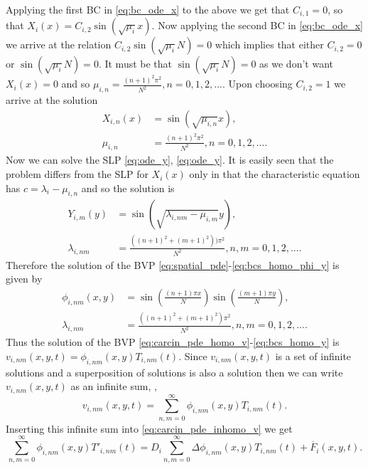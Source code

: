 \documentclass[\main/thesis.tex]{subfiles}
\begin{document}
Applying the first BC in \eqref{eq:bc_ode_x} to the above we get that $C_{i,1} {=} 0$, so that $X_i(x) {=} C_{i,2}\sin(\sqrt{\mu_i} x)$. Now applying the second BC in \eqref{eq:bc_ode_x} we arrive at the relation $C_{i,2}\sin(\sqrt{\mu_i} N) {=} 0$ which implies that either $C_{i,2} {=} 0$ or $\sin(\sqrt{\mu_i} N) {=} 0$. It must be that $\sin(\sqrt{\mu_i} N) {=} 0$ as we don't want $X_i(x) {=} 0$ and so $\mu_{i,n} {=} \frac{(n+1)^2\pi^2}{N^2}, n {=} 0, 1, 2, ...$. Upon choosing $C_{i,2} {=} 1$ we arrive at the solution
\begin{align*}
X_{i,n}(x) &{=} \sin(\sqrt{\mu_{i,n}} x), \\
\mu_{i,n} &{=} \frac{(n+1)^2\pi^2}{N^2}, n {=} 0, 1, 2, ....
\end{align*}
Now we can solve the SLP \eqref{eq:ode_y}, \eqref{eq:ode_y}. It is easily seen that the problem differs from the SLP for $X_i(x)$ only in that the characteristic equation has $c {=} \lambda_i {-} \mu_{i, n}$ and so the solution is
\begin{align*}
Y_{i,m}(y) &{=} \sin(\sqrt{\lambda_{i, nm}{-}\mu_{i, m}} y), \\
\lambda_{i, nm} &{=} \frac{((n+1)^2 {+} (m+1)^2))\pi^2}{N^2}, n,m {=} 0, 1, 2, ....
\end{align*}
Therefore the solution of the BVP \eqref{eq:spatial_pde}-\eqref{eq:bcs_homo_phi_y} is given by
\begin{align}
\phi_{i,nm}(x, y) &{=} \sin\left( \frac{(n+1)\pi x}{N} \right) \sin\left( \frac{(m+1)\pi y}{N} \right),
\label{eq:spatial_sol} \\
\lambda_{i, nm} &{=} \frac{((n+1)^2 {+} (m+1)^2)\pi^2}{N^2}, n,m {=} 0, 1, 2, ....
\label{eq:sep_const}
\end{align}
Thus the solution of the BVP \eqref{eq:carcin_pde_homo_v}-\eqref{eq:bcs_homo_y} is $v_{i,nm}(x, y, t) {=} \phi_{i,nm}(x, y)T_{i,nm}(t)$. Since $v_{i,nm}(x, y, t)$ is a set of infinite solutions and a superposition of solutions is also a solution then we can write $v_{i,nm}(x, y, t)$ as an infinite sum, \ie,
\begin{equation}
v_{i,nm}(x, y, t) {=} \sum_{n,m {=} 0}^{\infty} \phi_{i,nm}(x, y)T_{i,nm}(t).
\label{eq:variable_sol}
\end{equation}
Inserting this infinite sum into \eqref{eq:carcin_pde_inhomo_v} we get
\begin{equation*}
\sum_{n,m {=} 0}^{\infty} \phi_{i,nm}(x, y)T'_{i,nm}(t) {=} D_i \sum_{n,m {=} 0}^{\infty} \Delta \phi_{i,nm}(x, y) T_{i,nm}(t) {+} \overline{F}_i(x, y, t).
\end{equation*}
\end{document}
